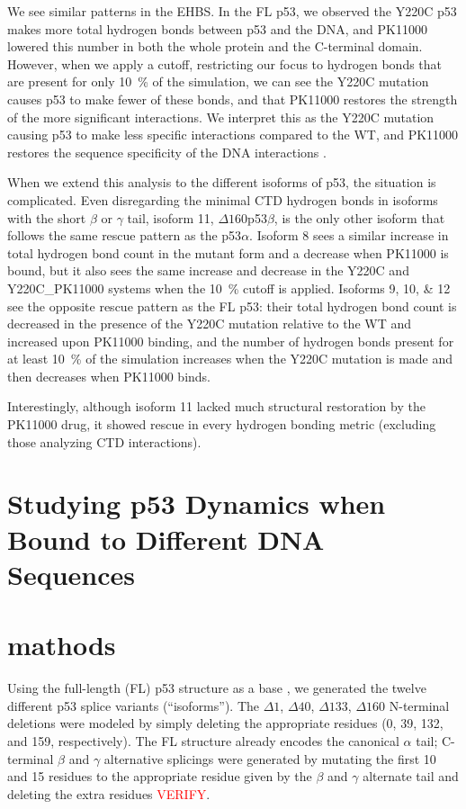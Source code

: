 We see similar patterns in the EHBS. In the FL p53, we observed the Y220C p53 makes more total hydrogen bonds between p53 and the DNA, and PK11000 lowered this number in both the whole protein and the C-terminal domain. However, when we apply a cutoff, restricting our focus to hydrogen bonds that are present for only \qty{10}{\percent} of the simulation, we can see the Y220C mutation causes p53 to make fewer of these bonds, and that PK11000 restores the strength of the more significant interactions. We interpret this as the Y220C mutation causing p53 to make less specific interactions compared to the WT, and PK11000 restores the sequence specificity of the DNA interactions \parencite{stetsonRestorationY220CP532025}.

When we extend this analysis to the different isoforms of p53, the situation is complicated. Even disregarding the minimal CTD hydrogen bonds in isoforms with the short \(\beta\) or \(\gamma\) tail, isoform \num{11}, \(\Delta160\)p53\(\beta\), is the only other isoform that follows the same rescue pattern as the p53\(\alpha\). Isoform \num{8} sees a similar increase in total hydrogen bond count in the mutant form and a decrease when PK11000 is bound, but it also sees the same increase and decrease in the Y220C and Y220C\_PK11000 systems when the \qty{10}{\percent} cutoff is applied. Isoforms \numlist{9;10;12} see the opposite rescue pattern as the FL p53: their total hydrogen bond count is decreased in the presence of the Y220C mutation relative to the WT and increased upon PK11000 binding, and the number of hydrogen bonds present for at least \qty{10}{\percent} of the simulation increases when the Y220C mutation is made and then decreases when PK11000 binds.

Interestingly, although isoform \num{11} lacked much structural restoration by the PK11000 drug, it showed rescue in every hydrogen bonding metric (excluding those analyzing CTD interactions).

\section{Studying p53 Dynamics when Bound to Different DNA Sequences}



\section{mathods}

Using the full-length (FL) p53 structure as a base \parencite{stetsonRestorationY220CP532025}, we generated the twelve different p53 splice variants (``isoforms''). The \(\Delta1\), \(\Delta40\), \(\Delta133\), \(\Delta160\) N-terminal deletions were modeled by simply deleting the appropriate residues (\num{0}, \num{39}, \num{132}, and \num{159}, respectively). The FL structure already encodes the canonical \(\alpha\) tail; C-terminal \(\beta\) and \(\gamma\) alternative splicings were generated by mutating the first \num{10} and \num{15} residues to the appropriate residue given by the \(\beta\) and \(\gamma\) alternate tail and deleting the extra residues \textcolor{red}{VERIFY}.

